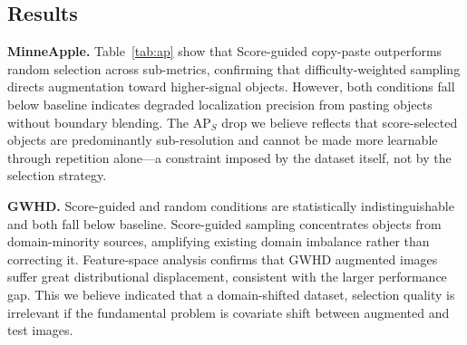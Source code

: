 \documentclass[conference]{IEEEtran}
\begin{document}
\subsection{Results}

\noindent\textbf{MinneApple.} Table~\ref{tab:ap} show that Score-guided 
copy-paste outperforms random selection across 
sub-metrics, confirming that
difficulty-weighted sampling directs augmentation toward
higher-signal objects.
However, both conditions fall below baseline indicates degraded
localization precision from pasting  objects without boundary
blending.  The AP$_S$ drop we believe reflects that score-selected
objects are predominantly sub-resolution and cannot be made more
learnable through repetition alone---a constraint imposed by the
dataset itself, not by the selection strategy.


\noindent\textbf{GWHD.}
Score-guided and random conditions are statistically
indistinguishable and both fall below baseline.
Score-guided sampling concentrates objects from domain-minority
sources, amplifying existing domain imbalance
rather than correcting it.
Feature-space analysis confirms that GWHD augmented images suffer
great distributional displacement, consistent with
the larger performance gap.
This we believe indicated that a domain-shifted dataset, 
selection quality is irrelevant if
the fundamental problem is covariate shift between augmented and
test images.

\begin{table}[t]
\centering
\caption{Copy-Paste Augmentation results}
\label{tab:ap}
\end{table}
\end{document}
